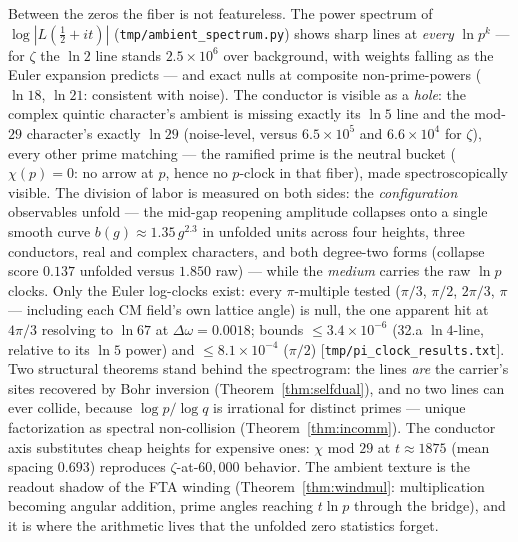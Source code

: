 \documentclass[11pt]{article}
\newcommand{\code}[1]{\texttt{#1}}
\begin{document}
Between the zeros the fiber is not featureless.  The power spectrum of $\log|L(\tfrac12+it)|$
(\code{tmp/ambient\_spectrum.py}) shows sharp lines at \emph{every} $\ln p^{k}$ --- for $\zeta$ the
$\ln2$ line stands $2.5\times10^{6}$ over background, with weights falling as the Euler expansion
predicts --- and exact nulls at composite non-prime-powers ($\ln18$, $\ln21$: consistent with
noise).  The conductor is visible as a \emph{hole}: the complex quintic character's ambient is
missing exactly its $\ln5$ line and the mod-$29$ character's exactly $\ln29$ (noise-level, versus
$6.5\times10^{5}$ and $6.6\times10^{4}$ for $\zeta$), every other prime matching --- the ramified
prime is the neutral bucket ($\chi(p)=0$: no arrow at $p$, hence no $p$-clock in that fiber), made
spectroscopically visible.  The division of labor is measured on both sides: the
\emph{configuration} observables unfold --- the mid-gap reopening amplitude collapses onto a single
smooth curve $b(g)\approx1.35\,g^{2.3}$ in unfolded units across four heights, three conductors,
real and complex characters, and both degree-two forms (collapse score $0.137$ unfolded versus
$1.850$ raw) --- while the \emph{medium} carries the raw $\ln p$ clocks.  Only the Euler log-clocks
exist: every $\pi$-multiple tested ($\pi/3$, $\pi/2$, $2\pi/3$, $\pi$ --- including each CM field's
own lattice angle) is null, the one apparent hit at $4\pi/3$ resolving to $\ln67$ at
$\Delta\omega=0.0018$; bounds $\le3.4\times10^{-6}$ (32.a $\ln4$-line, relative to its $\ln5$
power) and $\le8.1\times10^{-4}$ ($\pi/2$) [\code{tmp/pi\_clock\_results.txt}].  Two structural
theorems stand behind the spectrogram: the lines \emph{are} the carrier's sites recovered by Bohr
inversion (Theorem~\ref{thm:selfdual}), and no two lines can ever collide, because
$\log p/\log q$ is irrational for distinct primes --- unique factorization as spectral
non-collision (Theorem~\ref{thm:incomm}).  The conductor axis substitutes cheap heights for
expensive ones: $\chi$ mod $29$ at $t\approx1875$ (mean spacing $0.693$) reproduces
$\zeta$-at-$60{,}000$ behavior.  The ambient texture is
the readout shadow of the FTA winding (Theorem~\ref{thm:windmul}: multiplication becoming angular
addition, prime angles reaching $t\ln p$ through the bridge), and it is where the arithmetic lives
that the unfolded zero statistics forget.
\end{document}
